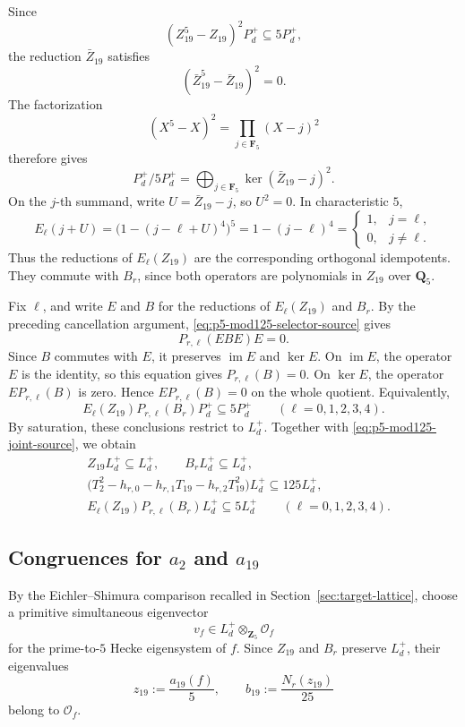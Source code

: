 \documentclass[11pt]{article}
\theoremstyle{plain}
\theoremstyle{definition}
\theoremstyle{remark}
\numberwithin{equation}{section}
\begin{document}
Since \[ (Z_{19}^5-Z_{19})^2P_d^+\subseteq5P_d^+, \] the reduction \(\bar Z_{19}\) satisfies \[ (\bar Z_{19}^5-\bar Z_{19})^2=0. \] The factorization \[ (X^5-X)^2=\prod_{j\in\mathbf F_5}(X-j)^2 \] therefore gives \[ P_d^+/5P_d^+ =\bigoplus_{j\in\mathbf F_5}\ker(\bar Z_{19}-j)^2. \] On the \(j\)-th summand, write \(U = \bar Z_{19} - j\), so \(U^2=0\). In characteristic \(5\), \[ E_\ell(j+U) =\bigl(1-(j-\ell+U)^4\bigr)^5 =1-(j-\ell)^4 = \begin{cases} 1,&j=\ell,\\ 0,&j\ne\ell. \end{cases} \] Thus the reductions of \(E_\ell(Z_{19})\) are the corresponding orthogonal idempotents. They commute with \(B_r\), since both operators are polynomials in \(Z_{19}\) over \(\mathbf Q_5\). 

Fix \(\ell\), and write \(E\) and \(B\) for the reductions of \(E_\ell(Z_{19})\) and \(B_r\). By the preceding cancellation argument, \eqref{eq:p5-mod125-selector-source} gives \[ P_{r,\ell}(EBE)E=0. \] Since \(B\) commutes with \(E\), it preserves \(\operatorname{im}E\) and \(\ker E\). On \(\operatorname{im}E\), the operator \(E\) is the identity, so this equation gives \(P_{r,\ell}(B)=0\). On \(\ker E\), the operator \(E P_{r,\ell}(B)\) is zero. Hence \(E P_{r,\ell}(B)=0\) on the whole quotient. Equivalently, \[ E_\ell(Z_{19})P_{r,\ell}(B_r)P_d^+ \subseteq5P_d^+ \qquad(\ell=0,1,2,3,4). \] By saturation, these conclusions restrict to \(L_d^+\). Together with \eqref{eq:p5-mod125-joint-source}, we obtain \begin{equation} \begin{aligned} &Z_{19}L_d^+\subseteq L_d^+, \qquad B_rL_d^+\subseteq L_d^+,\\ &\bigl(T_2^2-h_{r,0}-h_{r,1}T_{19} -h_{r,2}T_{19}^2\bigr)L_d^+ \subseteq125L_d^+,\\ &E_\ell(Z_{19})P_{r,\ell}(B_r)L_d^+ \subseteq5L_d^+ \qquad(\ell=0,1,2,3,4). \end{aligned} \label{eq:p5-mod125-target-relations} \end{equation}

\subsection{Congruences for \texorpdfstring{\(a_2\)}{a2} and \texorpdfstring{\(a_{19}\)}{a19}}

By the Eichler--Shimura comparison recalled in Section~\ref{sec:target-lattice}, choose a primitive simultaneous eigenvector \[ v_f\in L_d^+\otimes_{\mathbf Z_5}\mathcal O_f \] for the prime-to-\(5\) Hecke eigensystem of \(f\). Since \(Z_{19}\) and \(B_r\) preserve \(L_d^+\), their eigenvalues \[ z_{19}:=\frac{a_{19}(f)}5, \qquad b_{19}:=\frac{N_r(z_{19})}{25} \] belong to \(\mathcal O_f\). 
\end{document}
